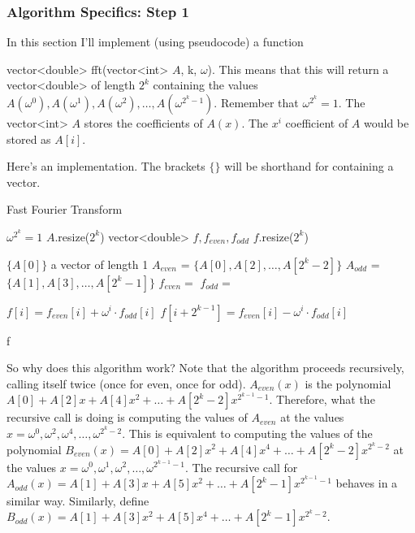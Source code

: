 \subsubsection{Algorithm Specifics: Step 1}

In this section I'll implement (using pseudocode) a function 

vector<double> fft(vector<int> $A$, k, $\omega$). This means that this will return a vector<double> of length $2^k$ containing the values $A(\omega^0), A(\omega^1), A(\omega^2), \dots, A(\omega^{2^k-1}).$ Remember that $\omega^{2^k} = 1.$ The vector<int> $A$ stores the coefficients of $A(x)$. The $x^i$ coefficient of $A$ would be stored as $A[i].$

Here's an implementation. The brackets $\{ \}$ will be shorthand for containing a vector.

\begin{algorithm}[H]
\caption{Fast Fourier Transform}
\begin{algorithmic}
 \Comment $\omega^{2^k} = 1$
	\State $A$.resize($2^k$)
	\State vector<double> $f, f_{even}, f_{odd}$
	\State $f$.resize($2^k$)
	
		\State \Return $ \{A[0] \}$ \Comment a vector of length 1
    \EndIf
    \State $A_{even}$ = $ \{A[0], A[2], \dots, A[2^k-2] \}$
    \State $A_{odd}$ = $ \{A[1], A[3], \dots, A[2^k-1] \}$
    \State $f_{even} = $ 
    \State $f_{odd} = $ 
    
    	\State $f[i] = f_{even}[i] + \omega^i \cdot f_{odd}[i]$
	\State $f[i+2^{k-1}] = f_{even}[i] - \omega^i \cdot f_{odd}[i]$

	\EndFor

\Return f

\EndFunction

\end{algorithmic}
\end{algorithm}

So why does this algorithm work? Note that the algorithm proceeds recursively, calling itself twice (once for even, once for odd). $A_{even}(x)$ is the polynomial $A[0] + A[2]x + A[4]x^2 + \dots + A[2^k-2]x^{2^{k-1}-1}.$ Therefore, what the recursive call is doing is computing the values of $A_{even}$ at the values $x = \omega^0, \omega^2, \omega^4, \dots, \omega^{2^k-2}.$ This is equivalent to computing the values of the polynomial $B_{even}(x) = A[0] + A[2]x^2 + A[4]x^4 + \dots + A[2^k-2]x^{2^{k}-2}$ at the values $x = \omega^0, \omega^1, \omega^2, \dots, \omega^{2^{k-1}-1}.$ The recursive call for $A_{odd}(x) = A[1] + A[3]x + A[5]x^2 + \dots + A[2^k-1]x^{2^{k-1}-1}$ behaves in a similar way. Similarly, define $B_{odd}(x) = A[1] + A[3]x^2 + A[5]x^4 + \dots + A[2^k-1]x^{2^{k}-2}.$

